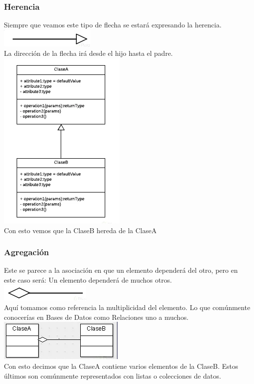 \documentclass[executivepaper]{article}
\begin{document}
\subsubsection*{Herencia}
Siempre que veamos este tipo de flecha se estará expresando la herencia.\\
\includegraphics[scale=0.5]{2.4.png}\\
La dirección de la flecha irá desde el hijo hasta el padre.\\
\includegraphics[scale=0.5]{2.5.png}\\
Con esto vemos que la ClaseB hereda de la ClaseA
\subsubsection*{Agregación}
Este se parece a la asociación en que un elemento dependerá del otro, pero en este caso será: Un elemento dependerá de muchos otros.\\
\includegraphics[scale=0.5]{2.6.png}\\
Aquí tomamos como referencia la multiplicidad del elemento. Lo que comúnmente conocerías en Bases de Datos como Relaciones uno a muchos.\\
\includegraphics[scale=0.5]{2.7.png}\\
Con esto decimos que la ClaseA contiene varios elementos de la ClaseB. Estos últimos son comúnmente representados con listas o colecciones de datos.
\end{document}
